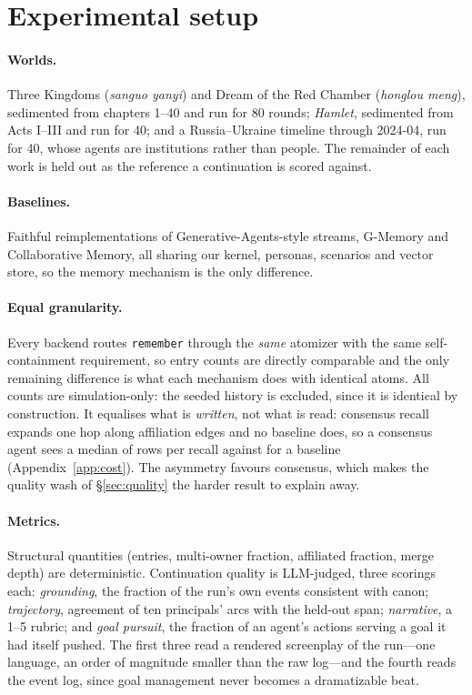 \documentclass{article}
\newcommand{\code}[1]{\texttt{\small #1}}
\begin{document}
\section{Experimental setup}
\label{sec:setup}

\paragraph{Worlds.} Three Kingdoms (\emph{sanguo yanyi}) and Dream of the Red
Chamber (\emph{honglou meng}), sedimented from chapters 1--40 and run for 80
rounds; \emph{Hamlet}, sedimented from Acts I--III and run for 40; and a
Russia--Ukraine timeline through 2024-04, run for 40, whose agents are
institutions rather than people. The remainder of each work is held out as the
reference a continuation is scored against.

\paragraph{Baselines.} Faithful reimplementations of Generative-Agents-style
streams, G-Memory and Collaborative Memory, all sharing our kernel, personas,
scenarios and vector store, so the memory mechanism is the only difference.

\paragraph{Equal granularity.} Every backend routes \code{remember} through the
\emph{same} atomizer with the same self-containment requirement, so entry counts
are directly comparable and the only remaining difference is what each mechanism
does with identical atoms. All counts are simulation-only: the seeded history is
excluded, since it is identical by construction. It equalises what is
\emph{written}, not what is read: consensus recall expands one hop along
affiliation edges and no baseline does, so a consensus agent sees a median of
\ExpTkTotal{} rows per recall against \ExpBaseK{} for a baseline
(Appendix~\ref{app:cost}). The asymmetry favours consensus, which makes the
quality wash of \S\ref{sec:quality} the harder result to explain away.

\paragraph{Metrics.} Structural quantities (entries, multi-owner fraction,
affiliated fraction, merge depth) are deterministic. Continuation quality is
LLM-judged, three scorings each: \emph{grounding}, the fraction of the run's own
events consistent with canon; \emph{trajectory}, agreement of ten principals'
arcs with the held-out span; \emph{narrative}, a 1--5 rubric; and \emph{goal
pursuit}, the fraction of an agent's actions serving a goal it had itself pushed.
The first three read a rendered screenplay of the run---one language, an order of
magnitude smaller than the raw log---and the fourth reads the event log, since
goal management never becomes a dramatizable beat.
\end{document}
